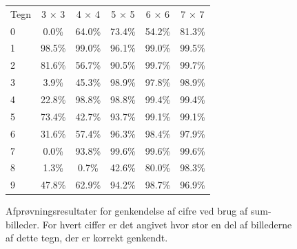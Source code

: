 \begin{figure}[htp]
\centering
\begin{tabular}{|l|c|c|c|c|c|}\hline
\rowcolor[gray]{0.9} \multicolumn{6}{|>{\columncolor[gray]{0.9}}c|}{\textbf{Genkendelse af cifre - Sum-billeder}} \\ \hline
Tegn & 3 $\times$ 3 & 4 $\times$ 4 & 5 $\times$ 5 & 6 $\times$ 6 & 7 $\times$ 7\\\hline
0 & 0.0\% & 64.0\% & 73.4\% & 54.2\% & 81.3\%\\\hline
1 & 98.5\%  & 99.0\% & 96.1\% & 99.0\% & 99.5\%\\\hline
2 & 81.6\% & 56.7\% & 90.5\% & 99.7\% & 99.7\%\\\hline
3 & 3.9\% & 45.3\% & 98.9\% & 97.8\% & 98.9\%\\\hline
4 & 22.8\% & 98.8\% & 98.8\% & 99.4\% & 99.4\%\\\hline
5 & 73.4\% & 42.7\% & 93.7\% & 99.1\% & 99.1\%\\\hline
6 & 31.6\% & 57.4\% & 96.3\% & 98.4\% & 97.9\%\\\hline
7 & 0.0\% & 93.8\% & 99.6\% & 99.6\% & 99.6\%\\\hline
8 & 1.3\% & 0.7\% & 42.6\% & 80.0\% & 98.3\%\\\hline
9 & 47.8\% & 62.9\% & 94.2\% & 98.7\% & 96.9\%\\\hline
\end{tabular}
\caption{Afprøvningsresultater for genkendelse af cifre ved brug af sum-billeder. For hvert ciffer er det angivet hvor stor en del af billederne af dette tegn, der er korrekt genkendt.}
\label{fig:test:sum_tal}
\end{figure}

